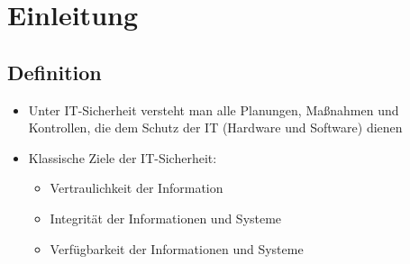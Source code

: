 


\begin{frame}[plain]
 \titlepage
\end{frame}




\section{Einleitung}

\subsection{Definition}
\begin{frame}
\begin{itemize}
	\item Unter IT-Sicherheit versteht man alle Planungen, Maßnahmen und Kontrollen, die dem Schutz der IT (Hardware und Software) dienen
	\item Klassische Ziele der IT-Sicherheit:
	\begin{itemize}
		\item Vertraulichkeit der Information
		\item Integrität der Informationen und Systeme
		\item Verfügbarkeit der Informationen und Systeme
	\end{itemize}
\end{itemize}
\end{frame}

